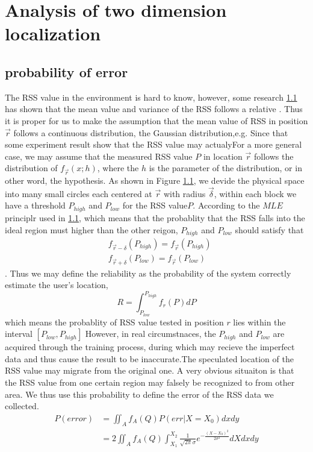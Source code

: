 \documentclass{article}
\begin{document}
\section{Analysis of two dimension localization}
\subsection{probability of error}
The RSS value in the environment is hard to know, however, some research \ref{} has shown that the mean value and variance of the RSS follows a relative . Thus it is proper for us to make the assumption that the mean value of RSS in position $\vec r$ follows a continuous distribution, the Gaussian distribution,e.g. Since that some experiment result show that the RSS value may actualyFor a more general case, we may assume that the measured RSS value $P$ in location $\vec r$ follows the distribution of $f_{\vec r}(x;h)$, where the $h$ is the parameter of the distribution, or in other word, the hypothesis.
As shown in Figure \ref{},  we devide the physical space into many small circles each centered at $\vec r$ with radius $\vec \delta$, within each block we have a threshold  $P_{high}$ and $P_{low}$ for the RSS value$P$.  According to the $MLE$ principlr used in \ref{}, which means that the probablity that the RSS falls into the ideal region must higher than the other reigon, $P_{high}$ and $P_{low}$ should satisfy that 
\begin{equation}
\begin{aligned}
&f_{\vec r-\delta}(P_{high})=f_{\vec r}(P_{high})\\
&f_{\vec r+\delta}(P_{low})=f_{\vec r}(P_{low}) 
\end{aligned}
\end{equation}
. Thus we may define the reliability as the probability of the system correctly estimate the user's location,  
\begin{equation}
R = \int_{{P_{low}}}^{{P_{high}}} {{f_r}(P)dP }
\end{equation}
which means the probablity of RSS value tested in position $r$ lies within the interval $[P_{low},P_{high}]$
However, in real circumstnaces, the $P_{high}$ and $P_{low}$ are acquired through the training process, during which may recieve the imperfect data and thus cause the result to be inaccurate.The speculated location of the RSS value may migrate from the original one.  A very obvious situaiton is that the RSS value from one certain region may falsely be recognized to from other area. We thus use this probability to define the error of the RSS data we collected.
\begin{equation}
\begin{aligned}
P(error) &= \iint_A {{f_A}}(Q)P(err|X = {X_0})dxdy\\
&= 2\iint_A {{f_A}}(Q)\int_{{X_1}}^{{X_2}} {\frac{1}{{\sqrt {2\pi } \sigma }}{e^{ - \frac{{{{(X - {X_0})}^2}}}{{2{\sigma ^2}}}}}} dXdxdy
\end{aligned}
\end{equation}
\end{document}
